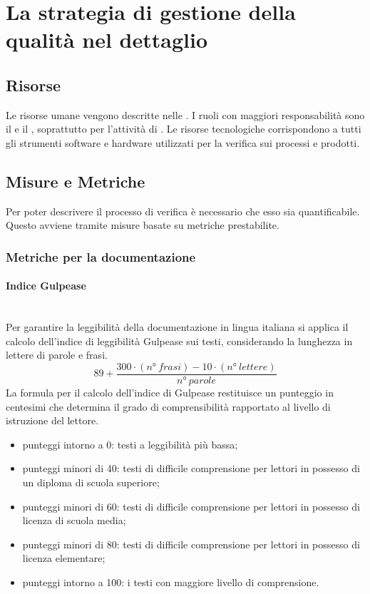 \section{La strategia di gestione della qualità nel dettaglio}

\subsection{Risorse}
Le risorse umane vengono descritte nelle \NormeDiProgetto{}. I ruoli con maggiori responsabilità sono il \Responsabile{} e il \Verificatore{}, soprattutto per l'attività di \VV{}.
Le risorse tecnologiche corrispondono a tutti gli strumenti software e hardware utilizzati per la verifica sui processi e prodotti.

\subsection{Misure e Metriche}\label{sec:metriche}
Per poter descrivere il processo di verifica è necessario che esso sia quantificabile. Questo avviene tramite misure basate su metriche prestabilite.

\subsubsection{Metriche per la documentazione}\label{sec:metriche_documentazione}
\paragraph{Indice Gulpease}\mbox{}\\
Per garantire la leggibilità della documentazione in lingua italiana si applica il calcolo dell'indice di leggibilità Gulpease sui testi, considerando la lunghezza in lettere di parole e frasi.
\[ 89+\frac{300 \cdot \left(n°\ frasi\right)-10 \cdot \left(n°\ lettere\right)}{n°\ parole} \]
La formula per il calcolo dell'indice di Gulpease restituisce un punteggio in centesimi che determina il grado di comprensibilità rapportato al livello di istruzione del lettore.
\begin{itemize}
	\item punteggi intorno a 0: testi a leggibilità più bassa;
	\item punteggi minori di 40: testi di difficile comprensione per lettori in possesso di un diploma di scuola superiore;
	\item punteggi minori di 60: testi di difficile comprensione per lettori in possesso di licenza di scuola media;
	\item punteggi minori di 80: testi di difficile comprensione per lettori in possesso di licenza elementare;
	\item punteggi intorno a 100: i testi con maggiore livello di comprensione.
\end{itemize}

